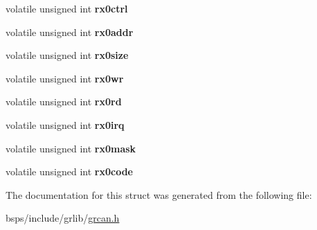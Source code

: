 \begin{DoxyCompactItemize}
\item 
\mbox{\label{structgrcan__regs_a4f851a034133f54ea393f3fbd640865d}} 
volatile unsigned int {\bfseries rx0ctrl}
\item 
\mbox{\label{structgrcan__regs_ac4cdbfc896f54a67e3e110638d80f8bc}} 
volatile unsigned int {\bfseries rx0addr}
\item 
\mbox{\label{structgrcan__regs_afe4187d1882e289105552ee2c11a1ef5}} 
volatile unsigned int {\bfseries rx0size}
\item 
\mbox{\label{structgrcan__regs_aeac1d5e579c8c87abc901b5e054161b4}} 
volatile unsigned int {\bfseries rx0wr}
\item 
\mbox{\label{structgrcan__regs_a5c27499c3601acaeed40f5c745be5730}} 
volatile unsigned int {\bfseries rx0rd}
\item 
\mbox{\label{structgrcan__regs_a6d87d9c2ed43990889320f61490a84b5}} 
volatile unsigned int {\bfseries rx0irq}
\item 
\mbox{\label{structgrcan__regs_a084075f53f4980b09a62e3b47e0e326d}} 
volatile unsigned int {\bfseries rx0mask}
\item 
\mbox{\label{structgrcan__regs_a2e03cbfa59a1e313a7227c0158ff834a}} 
volatile unsigned int {\bfseries rx0code}
\end{DoxyCompactItemize}


The documentation for this struct was generated from the following file\+:\begin{DoxyCompactItemize}
\item 
bsps/include/grlib/\mbox{\hyperlink{grcan_8h}{grcan.\+h}}\end{DoxyCompactItemize}
